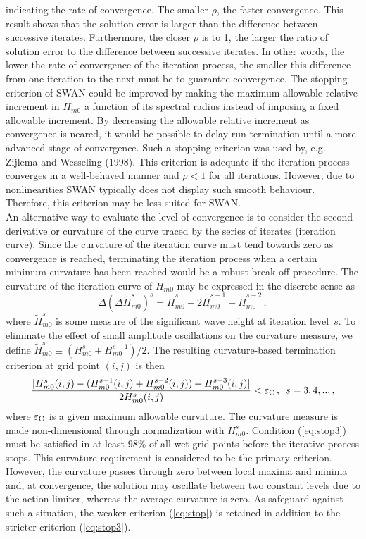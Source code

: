 \documentclass[12pt]{book}
\begin{document}
indicating the rate of convergence. The smaller $\rho$, the faster convergence. This result
shows that the solution error is larger than the difference between successive iterates.
Furthermore, the closer $\rho$ is to 1, the larger the ratio of solution error to the difference
between successive iterates. In other words, the lower the rate of convergence of the
iteration process, the smaller this difference
from one iteration to the next must be to guarantee convergence.
The stopping criterion of SWAN could be improved by making the maximum allowable relative increment
in $H_{m0}$ a function of its spectral
radius instead of imposing a fixed allowable
increment. By decreasing the allowable relative increment as
convergence is neared, it would be possible to delay run termination
until a more advanced stage of convergence.
Such a stopping criterion was used by, e.g. Zijlema and Wesseling (1998).
This criterion is adequate
if the iteration process converges in a well-behaved manner and $\rho < 1$ for all iterations.
However, due to nonlinearities SWAN typically does not display such
smooth behaviour. Therefore, this criterion may be less suited for SWAN.
\nocite{Zij98W}
\\[2ex]
\noindent
An alternative way to evaluate the level of convergence is to consider
the second
derivative or curvature of the curve traced by the series of iterates
(iteration curve). Since the curvature of the iteration curve must tend
towards zero as convergence is reached, terminating the
iteration process when a
certain minimum curvature has been reached would be a robust break-off procedure.
The curvature of the iteration curve of $H_{m0}$ may be expressed in the discrete sense as
\begin{equation}
  \Delta (\Delta \tilde{H}_{m0}^s)^s = \tilde{H}_{m0}^s - 2\tilde{H}_{m0}^{s-1} + \tilde{H}_{m0}^{s-2} \, ,
\end{equation}
where $\tilde{H}_{m0}^s$ is some measure of the significant wave height at
iteration level~$s$. To eliminate the effect of small amplitude
oscillations on the curvature measure, we define $\tilde{H}_{m0}^s
\equiv (H_{m0}^s +
H_{m0}^{s-1})/2$. The resulting curvature-based termination criterion at grid point $(i,j)$ is then
\begin{equation}
  \frac{| H_{m0}^s(i,j) - ( H_{m0}^{s-1}(i,j) + H_{m0}^{s-2}(i,j) ) +
  H_{m0}^{s-3}(i,j) | }{2 H_{m0}^s(i,j)}< \varepsilon_{\rm C} \, , \,\,\, s = 3, 4, ... \, ,
  \label{eq:stop3}
\end{equation}
where $\varepsilon_{\rm C}$ is a given maximum allowable curvature.
The curvature measure is made non-dimensional through normalization with $H_{m0}^s$.
Condition
(\ref{eq:stop3}) must be satisfied in at least 98\% of all wet grid points before the iterative process stops.
This curvature requirement is considered to be the primary criterion.
However, the curvature passes through zero between local maxima and minima and, at convergence, the solution
may oscillate between two constant levels due to the action limiter, whereas the average curvature is zero.
As safeguard
against such a situation, the weaker criterion (\ref{eq:stop}) is retained
in addition to the stricter criterion (\ref{eq:stop3}).
\end{document}
